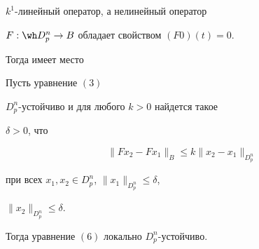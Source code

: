 $k^1$-линейный оператор, а нелинейный оператор


$F: \wh D_p^n \to B$ обладает свойством $(F0)(t) = 0$.


Тогда имеет место





\begin{thm}


Пусть уравнение $(3)$


$D_p^n$-устойчиво и для любого $k > 0$ найдется такое


$\delta > 0$, что


\begin{equation}


\|Fx_2 - Fx_1\|_B \le k\|x_2 - x_1\|_{D_p^n}


\end{equation}


при всех $x_1, x_2 \in D_p^n$, $\|x_1\|_{D_p^n} \le \delta$,


$\|x_2\|_{D_p^n} \le \delta$.


Тогда уравнение $(6)$ локально $D_p^n$-устойчиво.


\end{thm}





